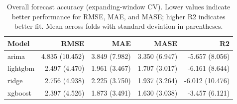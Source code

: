 \begin{table}
\caption{Overall forecast accuracy (expanding-window CV). Lower values indicate better performance for RMSE, MAE, and MASE; higher R2 indicates better fit. Mean across folds with standard deviation in parentheses.}
\begin{tabular}{lrrrr}
\toprule
Model & RMSE & MAE & MASE & R2 \\
\midrule
arima & 4.835 (10.452) & 3.849 (7.982) & 3.350 (6.947) & -5.657 (8.056) \\
lightgbm & 2.497 (4.470) & 1.961 (3.467) & 1.707 (3.017) & -6.161 (8.644) \\
ridge & 2.756 (4.938) & 2.225 (3.750) & 1.937 (3.264) & -6.012 (10.476) \\
xgboost & 2.397 (4.526) & 1.873 (3.491) & 1.630 (3.038) & -3.457 (6.121) \\
\bottomrule
\end{tabular}
\end{table}